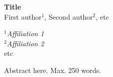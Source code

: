 \documentclass{article}
\begin{document}
\begin{center}
 {\large \bf Title}\\
First author$^1$, Second author$^2$, etc
\end{center}

\begin{center}
 {\it $^1$Affiliation 1}\\
{\it $^2$Affiliation 2}\\
etc
\end{center}

Abstract here. Max. 250 words.
\end{document}
